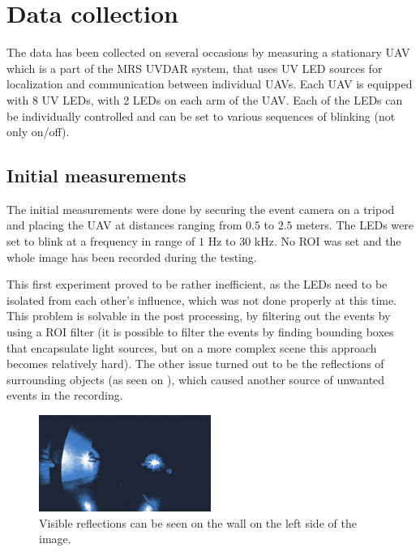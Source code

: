 \section{Data collection}

The data has been collected on several occasions by measuring a stationary UAV which is a part of the MRS UVDAR system, that
uses UV \ac{LED} sources for localization and communication between individual UAVs. 
Each UAV is equipped with 8 UV LEDs, with 2 LEDs on each arm of the UAV. Each of the LEDs can be individually controlled
and can be set to various sequences of blinking (not only on/off).

\subsection{Initial measurements}

The initial measurements were done by securing the event camera on a tripod and placing the UAV at distances ranging from
$0.5$ to $2.5$ meters. The LEDs were set to blink at a frequency in range of $1$ Hz to $30$ kHz. No \ac{ROI} was set
and the whole image has been recorded during the testing.

This first experiment proved to be rather inefficient, as the LEDs need to be isolated from each other's influence, which
was not done properly at this time. This problem is solvable in the post processing, by filtering out the events
by using a ROI filter (it is possible to filter the events by finding bounding boxes
that encapsulate light sources, but on a more complex scene this approach becomes relatively hard).
The other issue turned out to be the reflections of surrounding objects (as seen on ), which caused
another source of unwanted events in the recording.

\begin{figure}[H]
  \centering
  \includegraphics[width=0.5\textwidth]{./fig/photos/meas1.png}
  \caption{Visible reflections can be seen on the wall on the left side of the image.}
  \label{fig:meas1}
\end{figure}

